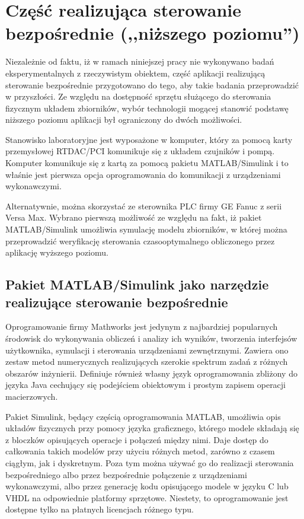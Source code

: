 \section{Część realizująca sterowanie bezpośrednie (,,niższego poziomu'')}
\label{sec:czesc-nizsza}

Niezależnie od faktu, iż w ramach niniejszej pracy nie wykonywano badań eksperymentalnych z rzeczywistym obiektem, część aplikacji realizującą sterowanie bezpośrednie przygotowano do tego, aby takie badania przeprowadzić w przyszłości.
Ze względu na dostępność sprzętu służącego do sterowania fizycznym układem zbiorników, wybór technologii mogącej stanowić podstawę niższego poziomu aplikacji był ograniczony do dwóch możliwości.

Stanowisko laboratoryjne jest wyposażone w komputer, który za pomocą karty przemysłowej RTDAC/PCI komunikuje się z układem czujników i pompą. Komputer komunikuje się z kartą za pomocą pakietu MATLAB/Simulink i to właśnie jest pierwsza opcja oprogramowania do komunikacji z urządzeniami wykonawczymi.

Alternatywnie, można skorzystać ze sterownika PLC firmy GE Fanuc z serii Versa Max. Wybrano pierwszą możliwość ze względu na fakt, iż pakiet MATLAB/Simulink umożliwia symulację modelu zbiorników, w której można przeprowadzić weryfikację sterowania czasooptymalnego obliczonego przez aplikację wyższego poziomu.

\subsection{Pakiet MATLAB/Simulink jako narzędzie realizujące sterowanie bezpośrednie}
\label{sub:czesc-nizsza-matlab}

Oprogramowanie firmy Mathworks jest jedynym z najbardziej popularnych środowisk do wykonywania obliczeń i analizy ich wyników, tworzenia interfejsów użytkownika, symulacji i sterowania urządzeniami zewnętrznymi. Zawiera ono zestaw metod numerycznych realizujących szerokie spektrum zadań z różnych obszarów inżynierii. Definiuje również własny język oprogramowania zbliżony do języka Java cechujący się podejściem obiektowym i prostym zapisem operacji macierzowych.

Pakiet Simulink, będący częścią oprogramowania MATLAB, umożliwia opis układów fizycznych przy pomocy języka graficznego, którego modele składają się z bloczków opisujących operacje i połączeń między nimi. Daje dostęp do całkowania takich modelów przy użyciu różnych metod, zarówno z czasem ciągłym, jak i dyskretnym. Poza tym można używać go do realizacji sterowania bezpośredniego albo przez bezpośrednie połączenie z urządzeniami wykonawczymi, albo przez generację kodu opisującego modele w języku C lub VHDL na odpowiednie platformy sprzętowe.
Niestety, to oprogramowanie jest dostępne tylko na płatnych licencjach różnego typu.

